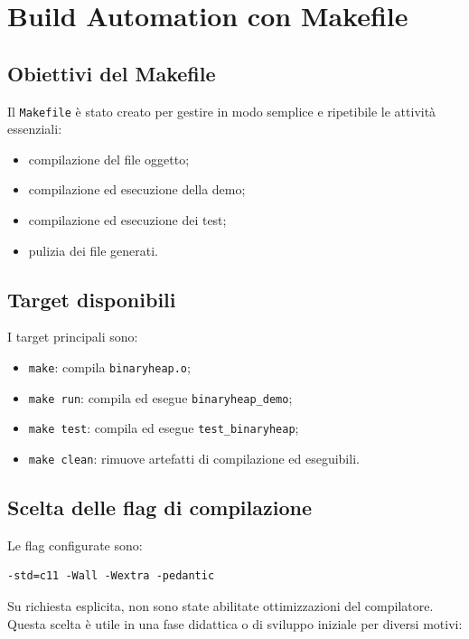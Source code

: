 \documentclass[a4paper,12pt]{article}
\begin{document}
\section{Build Automation con Makefile}

\subsection{Obiettivi del Makefile}

Il \texttt{Makefile} è stato creato per gestire in modo semplice e ripetibile le attività essenziali:

\begin{itemize}[leftmargin=*]
    \item compilazione del file oggetto;
    \item compilazione ed esecuzione della demo;
    \item compilazione ed esecuzione dei test;
    \item pulizia dei file generati.
\end{itemize}

\subsection{Target disponibili}

I target principali sono:

\begin{itemize}[leftmargin=*]
    \item \texttt{make}: compila \texttt{binaryheap.o};
    \item \texttt{make run}: compila ed esegue \texttt{binaryheap\_demo};
    \item \texttt{make test}: compila ed esegue \texttt{test\_binaryheap};
    \item \texttt{make clean}: rimuove artefatti di compilazione ed eseguibili.
\end{itemize}

\subsection{Scelta delle flag di compilazione}

Le flag configurate sono:

\begin{lstlisting}
-std=c11 -Wall -Wextra -pedantic
\end{lstlisting}

Su richiesta esplicita, non sono state abilitate ottimizzazioni del compilatore. Questa scelta è utile in una fase didattica o di sviluppo iniziale per diversi motivi:
\end{document}
